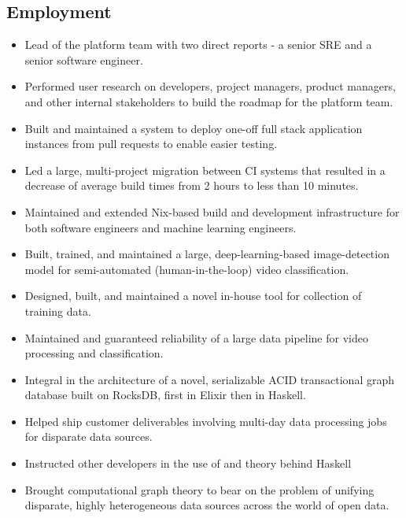 \documentclass[10pt,a4paper,sans]{moderncv}        %
\begin{document}
\subsection{Employment}
{\begin{itemize}
   \item Lead of the platform team with two direct reports - a senior SRE and
     a senior software engineer.
   \item Performed user research on developers, project managers, product
     managers, and other internal stakeholders to build the roadmap for the
     platform team.
   \item Built and maintained a system to deploy one-off full stack
     application instances from pull requests to enable easier testing.
   \item Led a large, multi-project migration between CI systems that resulted
     in a decrease of average build times from 2 hours to less than 10 minutes.
   \item Maintained and extended Nix-based build and development
     infrastructure for both software engineers and machine learning engineers.
 \end{itemize}}
{\begin{itemize}
   \item Built, trained, and maintained a large, deep-learning-based
     image-detection model for semi-automated (human-in-the-loop) video
     classification.
   \item Designed, built, and maintained a novel in-house tool for collection of
     training data.
   \item Maintained and guaranteed reliability of a large data pipeline for
     video processing and classification.
 \end{itemize}}
{\begin{itemize}
   \item Integral in the architecture of a novel, serializable ACID
     transactional graph database built on RocksDB, first in Elixir then in
     Haskell.
   \item Helped ship customer deliverables involving multi-day data
     processing jobs for disparate data sources.
   \item Instructed other developers in the use of and theory behind Haskell
   \item Brought computational graph theory to bear on the problem of unifying
     disparate, highly heterogeneous data sources across the world of open data.
 \end{itemize}}
\end{document}
